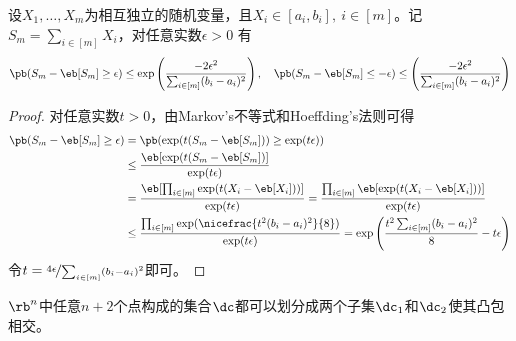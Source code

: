 \documentclass{ctexart}
\begin{document}
\begin{theorem}
    设$X_1, \ldots, X_m$为相互独立的随机变量，且$X_i \in [a_i, b_i], ~ i \in [m]$。记$S_m = \sum_{i \in [m]} X_i$，对任意实数$\epsilon > 0$ 有
    \begin{align*}
        \pb (S_m - \eb[S_m] \ge \epsilon) \le \exp \left( \frac{-2 \epsilon^2}{\sum_{i \in [m]} (b_i - a_i)^2} \right), \quad \pb (S_m - \eb[S_m] \le -\epsilon) \le \left( \frac{-2 \epsilon^2}{\sum_{i \in [m]} (b_i - a_i)^2} \right)
    \end{align*}
\end{theorem}

\begin{proof}
    对任意实数$t>0$，由Markov's不等式和Hoeffding's法则可得
    \begin{align*}
        \pb (S_m - \eb[S_m] \ge \epsilon)
         & = \pb (\exp (t(S_m - \eb[S_m])) \ge \exp(t\epsilon))                                                                                                             \\
         & \le \frac{\eb[\exp (t(S_m - \eb[S_m])]}{\exp(t\epsilon)}                                                                                                         \\
         & = \frac{\eb[\prod_{i \in [m]} \exp (t(X_i - \eb[X_i]))]}{\exp(t\epsilon)} = \frac{\prod_{i \in [m]} \eb[\exp (t(X_i - \eb[X_i]))]}{\exp (t \epsilon)}          \\
         & \le \frac{\prod_{i \in [m]} \exp (\nicefrac{t^2 (b_i - a_i)^2}{8})}{\exp (t \epsilon)} = \exp \left( \frac{t^2 \sum_{i \in [m]} (b_i - a_i)^2}{8} - t \epsilon \right)
    \end{align*}
    令$t = \nicefrac{4 \epsilon}{\sum_{i \in [m]} (b_i - a_i)^2}$即可。
\end{proof}

\begin{theorem}
    $\rb^n$中任意$n+2$个点构成的集合$\dc$都可以划分成两个子集$\dc_1$和$\dc_2$使其凸包相交。
\end{theorem}
\end{document}

